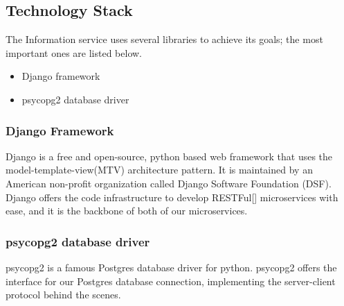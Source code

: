 		\subsection{Technology Stack}
			The Information service uses several libraries to achieve its goals; the most important ones are listed below.
			\begin{itemize}
				\item Django framework
				\item psycopg2 database driver
			\end{itemize}	
			\subsubsection{Django Framework}
				\label{django}
				
				Django is a free and open-source, python based web framework that uses the model-template-view(MTV) architecture pattern.  
				It is maintained by an American non-profit organization called Django Software Foundation (DSF). 
				Django offers the code infrastructure to develop RESTFul[\cite{restful-rfc7231}] microservices with ease, and it is the backbone 
				of both of our microservices.
			\subsubsection{psycopg2 database driver}
				\label{psycopg2}
				psycopg2 is a famous Postgres database driver for python. psycopg2 offers the interface for our Postgres database connection, implementing 
				the server-client protocol behind the scenes.
